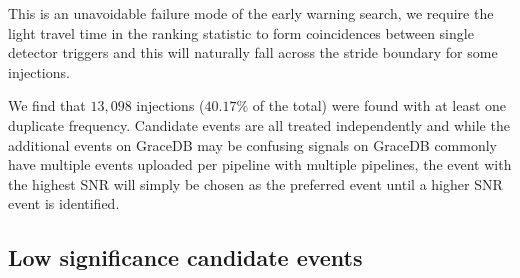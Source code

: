 This is an unavoidable failure mode of the early warning search, we require the light travel time in the ranking statistic to form coincidences between single detector triggers and this will naturally fall across the stride boundary for some injections. 



We find that $13,098$ injections ($40.17\%$ of the total) were found with at least one duplicate frequency. Candidate events are all treated independently and while the additional events on GraceDB may be confusing \gwadj signals on GraceDB commonly have multiple events uploaded per pipeline with multiple pipelines, the event with the highest SNR will simply be chosen as the preferred event until a higher SNR event is identified.

\subsection{\label{6:sec:false-alarms}Low significance candidate events}

